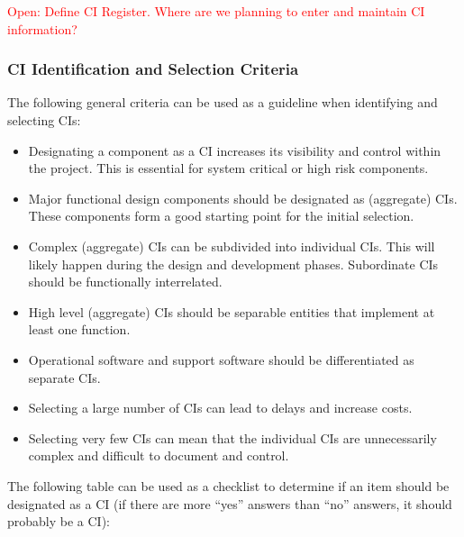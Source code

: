 \documentclass{template/openetcs_article}
\begin{document}
\textcolor{red}{Open: Define CI Register. Where are we planning to enter and maintain CI information?}


\subsubsection{CI Identification and Selection Criteria} %
\label{sec:CI Identification and Selection Criteria}

The following general criteria can be used as a guideline when identifying and selecting CIs:

\vspace{-10pt}
\begin{itemize}
\item Designating a component as a CI increases its visibility and control within the project. This is essential for system critical or high risk components.
\item Major functional design components should be designated as (aggregate) CIs. These components form a good starting point for the initial selection.
\item Complex (aggregate) CIs can be subdivided into individual CIs. This will likely happen during the design and development phases. Subordinate CIs should be functionally interrelated.
\item High level (aggregate) CIs should be separable entities that implement at least one function.
\item Operational software and support software should be differentiated as separate CIs.
\item Selecting a large number of CIs can lead to delays and increase costs.
\item Selecting very few CIs can mean that the individual CIs are unnecessarily complex and difficult to document and control. 
\end{itemize}

The following table can be used as a checklist to determine if an item should be designated as a CI (if there are more “yes” answers than “no” answers, it should probably be a CI):
\end{document}
